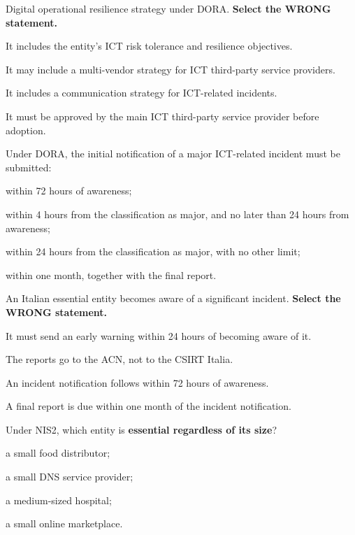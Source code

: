 \begin{domanda}[DORA]\label{q:dora-strategie}
Digital operational resilience strategy under DORA. \textbf{Select the WRONG statement.}
\begin{opzioni}
  \item It includes the entity's ICT risk tolerance and resilience objectives.
  \item It may include a multi-vendor strategy for ICT third-party service providers.
  \item It includes a communication strategy for ICT-related incidents.
  \item It must be approved by the main ICT third-party service provider before adoption.
\end{opzioni}
\end{domanda}

\begin{domanda}[DORA]\label{q:dora-iniziale}
Under DORA, the initial notification of a major ICT-related incident must be submitted:
\begin{opzioni}
  \item within 72 hours of awareness;
  \item within 4 hours from the classification as major, and no later than 24 hours from awareness;
  \item within 24 hours from the classification as major, with no other limit;
  \item within one month, together with the final report.
\end{opzioni}
\end{domanda}

\begin{domanda}\label{q:nis2-tempi}
An Italian essential entity becomes aware of a significant incident. \textbf{Select the WRONG
statement.}
\begin{opzioni}
  \item It must send an early warning within 24 hours of becoming aware of it.
  \item The reports go to the ACN, not to the CSIRT Italia.
  \item An incident notification follows within 72 hours of awareness.
  \item A final report is due within one month of the incident notification.
\end{opzioni}
\end{domanda}

\begin{domanda}\label{q:nis2-soggetti}
Under NIS2, which entity is \textbf{essential regardless of its size}?
\begin{opzioni}
  \item a small food distributor;
  \item a small DNS service provider;
  \item a medium-sized hospital;
  \item a small online marketplace.
\end{opzioni}
\end{domanda}

